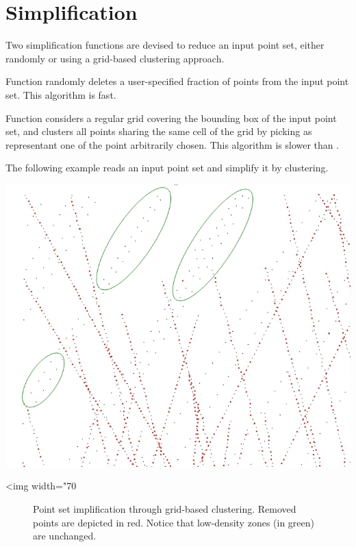 \section{Simplification}

Two simplification functions are devised to reduce an input point set, either randomly or using a grid-based clustering approach.

Function  randomly deletes a user-specified fraction of points from the input point set. This algorithm is fast.

Function  considers a regular grid covering the bounding box of the input point set, and clusters all points sharing the same cell of the grid by picking as representant one of the point arbitrarily chosen.
This algorithm is slower than .

\ccExample

The following example reads an input point set and simplify it by clustering.

\begin{center}
    \label{Point_set_processing_3-fig-grid_simplification}
    \begin{ccTexOnly}
        \includegraphics[width=1.0\textwidth]{Point_set_processing_3/grid_simplification} %
    \end{ccTexOnly}
    \begin{ccHtmlOnly}
        <img width="70%
    \end{ccHtmlOnly}
    \begin{figure}[h]
        \caption{Point set implification through grid-based clustering.
                 Removed points are depicted in red. Notice that low-density zones (in green) are unchanged.}
    \end{figure}
\end{center}



